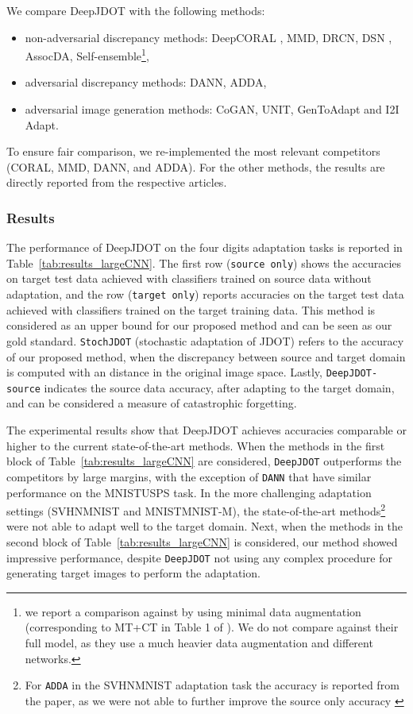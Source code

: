 \documentclass[runningheads]{llncs}
\begin{document}
We compare DeepJDOT with the following methods: 
\begin{itemize}
\item non-adversarial discrepancy methods: DeepCORAL \cite{deepcoral}, MMD\cite{LongMMD}, DRCN\cite{DRCN}, DSN \cite{DSN}, AssocDA\cite{AssocDA}, Self-ensemble\cite{french2018}{\footnote{we report a comparison against \cite{french2018} by using minimal data augmentation (corresponding to MT+CT in
Table 1 of \cite{french2018}). We do not compare against their full model, as they use a much heavier data augmentation and different networks.\label{ft:self-ensemble}}}, 
\item adversarial discrepancy methods: DANN\cite{Ganin2016}, ADDA\cite{Adda}, 
\item adversarial image generation methods: CoGAN\cite{CoGAN}, UNIT\cite{UNIT},  GenToAdapt\cite{GenToAdapt} and I2I Adapt\cite{I2IAdapt}. 
\end{itemize}
To ensure fair comparison, we re-implemented the most relevant competitors (CORAL, MMD, DANN, and ADDA). For the other methods, the results are directly reported from the respective articles.


\subsubsection*{Results} The performance of DeepJDOT on the four digits adaptation tasks is reported in Table~\ref{tab:results_largeCNN}. The first row (\texttt{source only}) shows the accuracies on target test data achieved with classifiers trained on source data without adaptation, and the row (\texttt{target only}) reports accuracies on the target test data achieved with classifiers trained on the target training data. This  method is considered as an upper bound for our proposed method and can be seen as our gold standard. \texttt{StochJDOT} (stochastic adaptation of JDOT) refers to the accuracy of our proposed method, when the discrepancy between source and target domain is computed with an  distance in the original image space. Lastly, \texttt{DeepJDOT-source} indicates the source data accuracy, after adapting to the target domain, and can be considered a measure of catastrophic forgetting.

The experimental results show that DeepJDOT achieves accuracies comparable or higher to the current state-of-the-art methods. When the methods in the first block of Table~\ref{tab:results_largeCNN} are considered, \texttt{DeepJDOT} outperforms the competitors by large margins, with the exception of \texttt{DANN} that have similar performance on the MNISTUSPS task. In the more challenging adaptation settings (SVHNMNIST and MNISTMNIST-M),
the state-of-the-art methods{\footnote{For \texttt{ADDA}\cite{Adda} in the SVHNMNIST adaptation task the accuracy is reported from the paper, as we were not able to further improve the source only accuracy \label{ft:adda}}}
 were not able to adapt well to the target domain. Next, when the methods in the second block of Table~\ref{tab:results_largeCNN} is considered, our method showed impressive performance, despite \texttt{DeepJDOT} not using any complex procedure for generating target images to perform the adaptation. 
\end{document}

